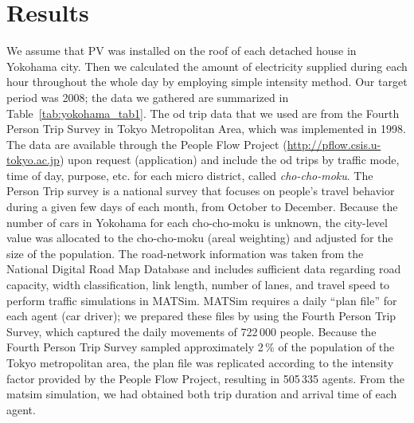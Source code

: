 \section{Results}
We assume that PV was installed on the roof of each detached house in Yokohama city. Then we calculated the amount of electricity supplied during each hour throughout the whole day by employing simple intensity method. Our target period was 2008; the data we gathered are summarized in Table~\ref{tab:yokohama_tab1}. The \gls{od} trip data that we used are from the Fourth Person Trip Survey in Tokyo Metropolitan Area, which was implemented in 1998. The data are available through the People Flow Project (\url{http://pflow.csis.u-tokyo.ac.jp}) upon request (application) and include the \gls{od} trips by traffic mode, time of day, purpose, etc. for each micro district, called \emph{cho-cho-moku}. The Person Trip survey is a national survey that focuses on people's travel behavior during a given few days of each month, from October to December. Because the number of cars in Yokohama for each cho-cho-moku is unknown, the city-level value was allocated to the cho-cho-moku (areal weighting) and adjusted for the size of the population. The road-network information was taken from the National Digital Road Map Database and includes sufficient data regarding road capacity, width classification, link length, number of lanes, and travel speed to perform traffic simulations in MATSim. MATSim requires a daily ``plan file'' for each agent (car driver); we prepared these files by using the Fourth Person Trip Survey, which captured the daily movements of 722\,000 people. Because the Fourth Person Trip Survey sampled approximately 2\,\% of the population of the Tokyo metropolitan area, the plan file was replicated according to the intensity factor provided by the People Flow Project, resulting in 505\,335 agents. From the \gls{matsim} simulation, we had obtained both trip duration and arrival time of each agent. 

